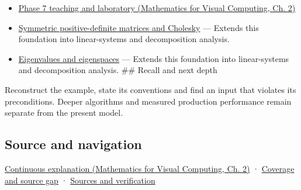 \hypertarget{appendix-175ca5ff874d-used-by}{}

\begin{itemize}
\tightlist
\item
  \href{../02-Mathematics-for-Visual-Computing/main.pdf\#nameddest=01-foundations-i-ch018-keep-the-promises-visible-while-moving-between-representations}{Phase 7 teaching and laboratory (Mathematics for Visual Computing, Ch. 2)}
\item
  \hyperref[appendix-50d2ea3c9b26]{Symmetric positive-definite matrices and Cholesky} --- Extends this foundation into linear-systems and decomposition analysis.
\item
  \hyperref[appendix-0b3be18411f9]{Eigenvalues and eigenspaces} --- Extends this foundation into linear-systems and decomposition analysis. \#\# Recall and next depth
\end{itemize}

Reconstruct the example, state its conventions and find an input that violates its preconditions. Deeper algorithms and measured production performance remain separate from the present model.

\subsection{Source and navigation}\label{appendix-175ca5ff874d-source-and-navigation}

\hypertarget{appendix-175ca5ff874d-source-and-navigation}{}

\href{../02-Mathematics-for-Visual-Computing/main.pdf\#nameddest=01-foundations-i-ch018-keep-the-promises-visible-while-moving-between-representations}{Continuous explanation (Mathematics for Visual Computing, Ch. 2)} · \hyperref[appendix-fd090d982a15-phase-7---parts-601-700]{Coverage and source gap} · \hyperref[appendix-a103e7846d21-phase-7---source-analysis-and-verification]{Sources and verification}
